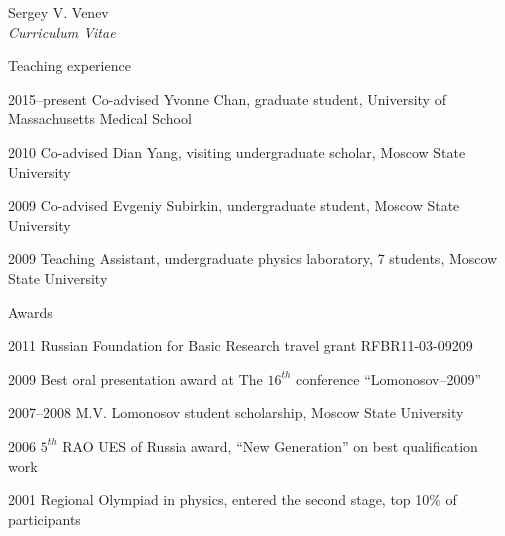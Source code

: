 \documentclass[10pt]{article}
\begin{document}
\begin{cv}{Sergey V. Venev\\{\large \itshape Curriculum Vitae}}
\setlength{\oldcvlabelwidth}{\cvlabelwidth}
\setlength{\cvlabelwidth}{1em}
\begin{cvlist}{Teaching experience}
        \item[2015--present] Co-advised Yvonne Chan, graduate student, University of Massachusetts Medical School
        \item[2010] Co-advised Dian Yang, visiting undergraduate scholar, Moscow State University
        \item[2009] Co-advised Evgeniy Subirkin, undergraduate student, Moscow State University
        \item[2009] Teaching Assistant, undergraduate physics laboratory, 7 students, Moscow State University
\end{cvlist}
\setlength{\cvlabelwidth}{\oldcvlabelwidth}



\begin{cvlist}{Awards}
    \item[2011] Russian Foundation for Basic Research travel grant RFBR11-03-09209  
    \item[2009] Best oral presentation award at The $16^{th}$ conference ``Lomonosov--2009''  
    \item[2007--2008] M.V. Lomonosov student scholarship, Moscow State University  
    \item[2006] $5^{th}$ RAO UES of Russia award, ``New Generation'' on best qualification work 
    \item[2001] Regional Olympiad in physics, entered the second stage, top 10\% of participants
\end{cvlist}






\setlength{\oldcvlabelwidth}{\cvlabelwidth}
\setlength{\cvlabelwidth}{1em}
\renewcommand*{\biblabelsep}{1.5em}
% 


\end{cv}
\end{document}
